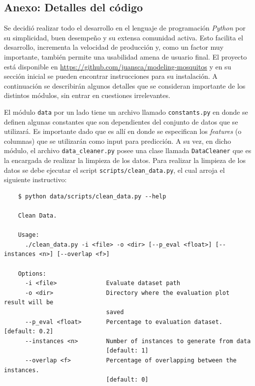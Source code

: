\begin{appendix}
\chapter{Anexo: Detalles del código}\label{Anexo_codigo}

  \par Se decidió realizar todo el desarrollo en el lenguaje de programación
    \textit{Python} por su simplicidad, buen desempeño y su extensa
    comunidad activa. Esto facilita el desarrollo, incrementa la velocidad
    de producción y, como un factor muy importante, también permite
    una usabilidad amena de usuario final. El proyecto está disponible
    en \url{https://github.com/juansca/modeling-mosquitos} y en su sección
    inicial se pueden encontrar instrucciones para su instalación.
    A continuación se describirán
    algunos detalles que se consideran importante de los distintos módulos,
    sin entrar en cuestiones irrelevantes.

  \par El módulo \verb|data| por un lado tiene un archivo llamado
    \verb|constants.py| en donde se definen algunas constantes que
    son dependientes del conjunto de datos que se utilizará. Es importante
    dado que es allí en donde se especifican los \textit{features} (o
    columnas) que se utilizarán como input para predicción.
    A su vez, en dicho módulo, el archivo \verb|data_cleaner.py|
    posee una clase llamada \verb|DataCleaner| que es la encargada de
    realizar la limpieza de los datos. Para realizar la limpieza de los
    datos se debe ejecutar el script \verb|scripts/clean_data.py|, el
    cual arroja el siguiente instructivo:

    \begin{lstlisting}
    $ python data/scripts/clean_data.py --help

    Clean Data.

    Usage:
      ./clean_data.py -i <file> -o <dir> [--p_eval <float>] [--instances <n>] [--overlap <f>]

    Options:
      -i <file>              Evaluate dataset path
      -o <dir>               Directory where the evaluation plot result will be
                             saved
      --p_eval <float>       Percentage to evaluation dataset. [default: 0.2]
      --instances <n>        Number of instances to generate from data
                             [default: 1]
      --overlap <f>          Percentage of overlapping between the instances.
                             [default: 0]


\end{lstlisting}
\end{appendix}

